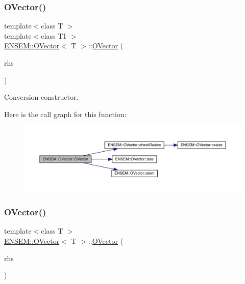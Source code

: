 \mbox{\label{classENSEM_1_1OVector_a1d68ef86b31297a79368789f7a0e43bc}} 
\subsubsection{\texorpdfstring{OVector()}{OVector()}\hspace{0.1cm}{\footnotesize\ttfamily [5/6]}}
{\footnotesize\ttfamily template$<$class T $>$ \\
template$<$class T1 $>$ \\
\mbox{\hyperlink{classENSEM_1_1OVector}{E\+N\+S\+E\+M\+::\+O\+Vector}}$<$ T $>$\+::\mbox{\hyperlink{classENSEM_1_1OVector}{O\+Vector}} (\begin{DoxyParamCaption}\item[{const \mbox{\hyperlink{classENSEM_1_1OVector}{O\+Vector}}$<$ T1 $>$ \&}]{rhs }\end{DoxyParamCaption})\hspace{0.3cm}{\ttfamily [inline]}}



Conversion constructor. 

Here is the call graph for this function\+:
\nopagebreak
\begin{figure}[H]
\begin{center}
\leavevmode
\includegraphics[width=350pt]{d0/d8d/classENSEM_1_1OVector_a1d68ef86b31297a79368789f7a0e43bc_cgraph}
\end{center}
\end{figure}
\mbox{\label{classENSEM_1_1OVector_a10129359c78668211e551f3b13829208}} 
\subsubsection{\texorpdfstring{OVector()}{OVector()}\hspace{0.1cm}{\footnotesize\ttfamily [6/6]}}
{\footnotesize\ttfamily template$<$class T $>$ \\
\mbox{\hyperlink{classENSEM_1_1OVector}{E\+N\+S\+E\+M\+::\+O\+Vector}}$<$ T $>$\+::\mbox{\hyperlink{classENSEM_1_1OVector}{O\+Vector}} (\begin{DoxyParamCaption}\item[{const \mbox{\hyperlink{classENSEM_1_1OVector}{O\+Vector}}$<$ T $>$ \&}]{rhs }\end{DoxyParamCaption})\hspace{0.3cm}{\ttfamily [inline]}}



